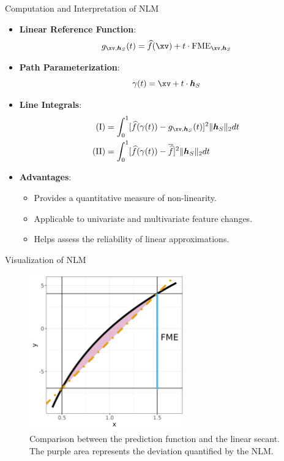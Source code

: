 \documentclass[11pt,compress,t,notes=noshow, aspectratio=169, xcolor=table]{beamer}
\newcommand{\boldhS}{\bm{h}_{S}}
\begin{document}
\begin{frame}{Computation and Interpretation of NLM}
\begin{itemize}
\item \textbf{Linear Reference Function}:
\[
g_{\xv, \boldhS}(t) = \widehat{f}(\xv) + t \cdot \text{FME}_{\xv, \boldhS}
\]
\item \textbf{Path Parameterization}:
\[
\gamma(t) = \xv + t \cdot \boldhS
\]
\item \textbf{Line Integrals}:
\begin{align*}
\text{(I)} &= \int_0^1 [\widehat{f}(\gamma(t)) - g_{\xv, \boldhS}(t)]^2 \Vert \boldhS \Vert_2 dt \\
\text{(II)} &= \int_0^1 [\widehat{f}(\gamma(t)) - \overline{\widehat{f}}]^2 \Vert \boldhS \Vert_2 dt
\end{align*}
\item \textbf{Advantages}:
\begin{itemize}
\item Provides a quantitative measure of non-linearity.
\item Applicable to univariate and multivariate feature changes.
\item Helps assess the reliability of linear approximations.
\end{itemize}
\end{itemize}
\end{frame}

\begin{frame}{Visualization of NLM}
\begin{figure}
  \centering
  \includegraphics[width=0.6\textwidth]{figure-man/forward_me_deviation.png}
  \caption{Comparison between the prediction function and the linear secant. The purple area represents the deviation quantified by the NLM.}
\end{figure}
\end{frame}
\end{document}
